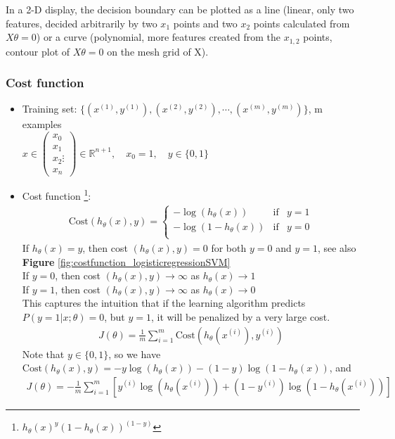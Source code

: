 In a 2-D display, the decision boundary can be plotted as a line (linear, only two features, decided arbitrarily by two $x_1$ points and two $x_2$ points calculated from $X\theta = 0$) or a curve (polynomial, more features created from the $x_{1,2}$ points, contour plot of $X\theta = 0$ on the mesh grid of X).


\subsubsection{Cost function}
\begin{itemize}

\item
Training set: $\{(x^{(1)}, y^{(1)}), (x^{(2)}, y^{(2)}), \cdots, (x^{(m)}, y^{(m)})\}$, m examples\\
$x \in \begin{pmatrix} x_0 \\ x_1 \\ x_2 \vdots \\ x_n \end{pmatrix} \in \mathbb{R}^{n+1}, \quad x_0 = 1, \quad y \in \{0,1\}$

\item
    Cost function \footnote{$h_\theta(x)^y(1-h_\theta(x))^{(1-y)}$}: 
    \begin{align} 
        \text{Cost}(h_\theta(x),y) = \left\{ \begin{array}{rcl}
            -\log(h_\theta(x)) & \mbox{if} & y=1 \\ 
            -\log(1- h_\theta(x)) & \mbox{if} & y=0 \\ \end{array}\right.
    \end{align}
    If  $h_\theta(x)=y$, then cost $(h_\theta(x), y)=0$ for both $y=0$ and $y=1$, see also \textbf{Figure} \ref{fig:costfunction_logisticregressionSVM}\\
    If  $y=0$, then cost $(h_\theta(x), y) \rightarrow \infty$ as $h_\theta(x) \rightarrow 1$\\
    If  $y=1$, then cost $(h_\theta(x), y) \rightarrow \infty$ as $h_\theta(x) \rightarrow 0$\\
    This captures the intuition that if the learning algorithm predicts $P(y=1|x;\theta)=0$, but $y=1$, it will be penalized by a very large cost.
    \begin{align*} 
    J(\theta) = \frac{1}{m}\sum_{i=1}^m\text{Cost}(h_\theta(x^{(i)}), y^{(i)})
    \end{align*}
    Note that $y \in \{0, 1\}$, so we have
    $\text{Cost}(h_\theta(x),y) = -y\log(h_\theta(x)) - (1-y)\log(1- h_\theta(x))$, and
    \begin{align} 
        J(\theta) = -\frac{1}{m}\sum_{i=1}^m \left[ y^{(i)}\log(h_\theta(x^{(i)})) + (1-y^{(i)})\log(1- h_\theta(x^{(i)})) \right]
    \end{align}
    

\end{itemize}
